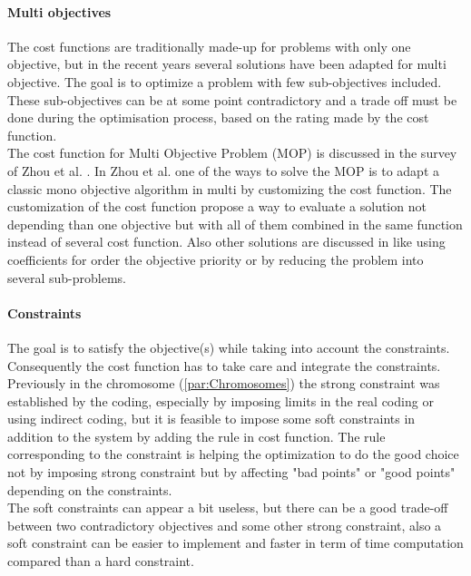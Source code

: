 \paragraph*{Multi objectives}
The cost functions are traditionally made-up for  problems with only one objective, but in the recent years several solutions have been adapted for multi objective. The goal is to optimize a problem with few sub-objectives included. These sub-objectives can be at some point contradictory and a trade off must be done during the optimisation process, based on the rating made by the cost function. \\
 The cost function for Multi Objective Problem (MOP) is discussed in the survey of Zhou et al. \cite{75*zhou2011}. In Zhou et al. \cite{75*zhou2011} one of the ways to solve the MOP is to adapt a classic mono objective algorithm in multi by customizing the cost function. The customization of the cost function propose a way to evaluate a solution not depending than one objective but with all of them combined in the same function instead of several cost function. 
 Also other solutions are discussed in \cite{75*zhou2011} like using coefficients for order the objective priority or by reducing the problem into several sub-problems. \\ %

\paragraph*{Constraints}
The goal is to satisfy the objective(s) while taking into account the constraints. Consequently the cost function has to take care and integrate the constraints. 
 Previously in the chromosome (\ref{par:Chromosomes}) the strong constraint was established by the coding, especially by imposing limits in the real coding or using indirect coding, but it is feasible to impose some soft constraints in addition to the system by adding the rule in cost function. The rule corresponding to the constraint is helping the optimization to do the good choice not by imposing strong constraint but by affecting "bad points" or "good points" depending on the constraints. \\
 The soft constraints can appear a bit useless, but there can be a good trade-off between two contradictory objectives and some other strong constraint, also a soft constraint can be easier to implement and faster in term of time computation compared than a hard constraint.  

